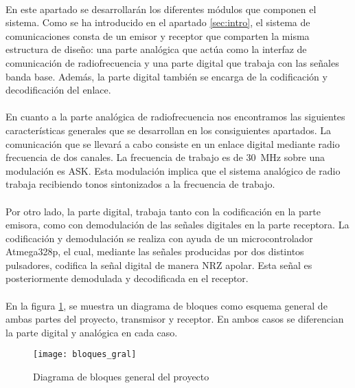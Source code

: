\paragraph{}
En este apartado se desarrollar\'an los diferentes módulos que componen el sistema.
Como se ha introducido en el apartado \ref{sec:intro}, el sistema de comunicaciones consta de un emisor y receptor que comparten la misma estructura de diseño: 
una parte analógica que actúa como la interfaz de comunicación de radiofrecuencia y una parte digital que trabaja con las señales banda base. Además, la parte digital también se encarga de la codificación y decodificación del enlace.
\paragraph{}
En cuanto a la parte analógica de radiofrecuencia nos encontramos las siguientes características generales que se desarrollan en los consiguientes apartados. 
La comunicaci\'on que se llevará a cabo consiste en un enlace digital mediante radio frecuencia de dos canales.
La frecuencia de trabajo es de \SI{30}{\mega\hertz} sobre una modulación es ASK.
Esta modulación implica que el sistema analógico de radio trabaja recibiendo tonos sintonizados a la frecuencia de trabajo.
\paragraph{}
Por otro lado, la parte digital, trabaja tanto con
la codificación en la parte emisora, como con demodulación de las señales digitales en la parte receptora. 
La codificación y demodulación se realiza con ayuda de un microcontrolador Atmega328p, el cual, mediante las señales producidas por dos distintos pulsadores, codifica la señal digital de manera NRZ apolar.
Esta señal es posteriormente demodulada y decodificada en el receptor.
\paragraph{}
En la figura \ref{fig:bloques_gral}, se muestra un diagrama de bloques como esquema general de ambas partes del proyecto, transmisor y receptor. En ambos casos se diferencian la parte digital y anal\'ogica en cada caso.

\begin{figure}[h]
    \centering
    \texttt{[image: bloques\_gral]}
    \caption{Diagrama de bloques general del proyecto}
    \label{fig:bloques_gral}
\end{figure}
